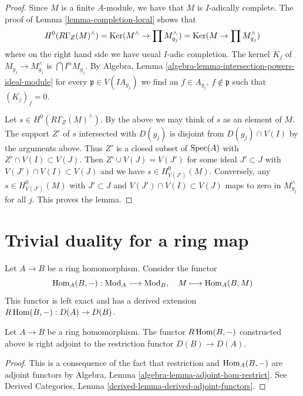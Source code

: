 \begin{proof}
Since $M$ is a finite $A$-module, we have that $M$ is $I$-adically complete.
The proof of Lemma \ref{lemma-completion-local} shows that
$$
H^0(R\Gamma_Z(M)^\wedge) =
\mathop{\mathrm{Ker}}(M^\wedge \to \prod M_{g_j}^\wedge) =
\mathop{\mathrm{Ker}}(M \to \prod M_{g_j}^\wedge)
$$
where on the right hand side we have usual $I$-adic completion.
The kernel $K_j$ of $M_{g_j} \to M_{g_j}^\wedge$ is $\bigcap I^n M_{g_j}$.
By Algebra, Lemma \ref{algebra-lemma-intersection-powers-ideal-module}
for every $\mathfrak p \in V(IA_{g_j})$ we find an
$f \in A_{g_j}$, $f \not \in \mathfrak p$ such that $(K_j)_f = 0$.

\medskip\noindent
Let $s \in H^0(R\Gamma_Z(M)^\wedge)$.
By the above we may think of $s$ as an element of $M$.
The support $Z'$ of $s$ intersected with $D(g_j)$ is disjoint from
$D(g_j) \cap V(I)$ by the arguments above.
Thus $Z'$ is a closed subset of $\mathop{\mathrm{Spec}}(A)$ with $Z' \cap V(I) \subset V(J)$.
Then $Z' \cup V(J) = V(J')$ for some ideal $J' \subset J$ with
$V(J') \cap V(I) \subset V(J)$ and we have $s \in H^0_{V(J')}(M)$.
Conversely, any $s \in H^0_{V(J')}(M)$ with $J' \subset J$ and
$V(J') \cap V(I) \subset V(J)$ maps to zero in $M_{g_j}^\wedge$ for all $j$.
This proves the lemma.
\end{proof}









\section{Trivial duality for a ring map}
\label{section-trivial}

\noindent
Let $A \to B$ be a ring homomorphism. Consider the functor
$$
\mathop{\mathrm{Hom}}\nolimits_A(B, -) : \text{Mod}_A \longrightarrow \text{Mod}_B,\quad
M \longmapsto \mathop{\mathrm{Hom}}\nolimits_A(B, M)
$$
This functor is left exact and has a derived extension
$R\mathop{\mathrm{Hom}}\nolimits(B, -) : D(A) \to D(B)$.

\begin{lemma}
\label{lemma-right-adjoint}
Let $A \to B$ be a ring homomorphism. The functor $R\mathop{\mathrm{Hom}}\nolimits(B, -)$
constructed above is right adjoint to the restriction functor
$D(B) \to D(A)$.
\end{lemma}

\begin{proof}
This is a consequence of the fact that restriction and $\mathop{\mathrm{Hom}}\nolimits_A(B, -)$ are
adjoint functors by Algebra, Lemma \ref{algebra-lemma-adjoint-hom-restrict}.
See Derived Categories, Lemma \ref{derived-lemma-derived-adjoint-functors}.
\end{proof}


